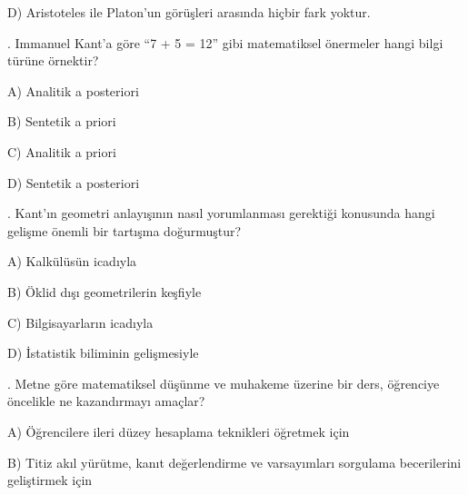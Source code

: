\par\noindent\hspace*{1.6em}D) Aristoteles ile Platon’un görüşleri arasında hiçbir fark yoktur.

\par\smallskip{}. Immanuel Kant’a göre “7 + 5 = 12” gibi matematiksel önermeler hangi bilgi türüne örnektir?

\par\noindent\hspace*{1.6em}A) Analitik a posteriori

\par\noindent\hspace*{1.6em}B) Sentetik a priori

\par\noindent\hspace*{1.6em}C) Analitik a priori

\par\noindent\hspace*{1.6em}D) Sentetik a posteriori

\par\smallskip{}. Kant’ın geometri anlayışının nasıl yorumlanması gerektiği konusunda hangi gelişme önemli bir tartışma doğurmuştur?

\par\noindent\hspace*{1.6em}A) Kalkülüsün icadıyla

\par\noindent\hspace*{1.6em}B) Öklid dışı geometrilerin keşfiyle

\par\noindent\hspace*{1.6em}C) Bilgisayarların icadıyla

\par\noindent\hspace*{1.6em}D) İstatistik biliminin gelişmesiyle

\par\smallskip{}. Metne göre matematiksel düşünme ve muhakeme üzerine bir ders, öğrenciye öncelikle ne kazandırmayı amaçlar?

\par\noindent\hspace*{1.6em}A) Öğrencilere ileri düzey hesaplama teknikleri öğretmek için

\par\noindent\hspace*{1.6em}B) Titiz akıl yürütme, kanıt değerlendirme ve varsayımları sorgulama becerilerini geliştirmek için

